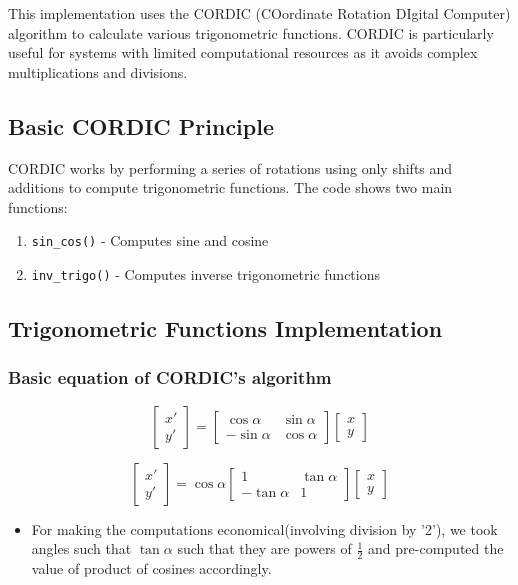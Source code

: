 \documentclass[12pt]{article}
\begin{document}
This implementation uses the CORDIC (COordinate Rotation DIgital Computer) algorithm to calculate various trigonometric functions. CORDIC is particularly useful for systems with limited computational resources as it avoids complex multiplications and divisions.

\subsection{Basic CORDIC Principle}

CORDIC works by performing a series of rotations using only shifts and additions to compute trigonometric functions. The code shows two main functions:

\begin{enumerate}
    \item \texttt{sin\_cos()} - Computes sine and cosine
    \item \texttt{inv\_trigo()} - Computes inverse trigonometric functions
\end{enumerate}

\subsection{Trigonometric Functions Implementation}
\subsubsection{Basic equation of CORDIC's algorithm}

\[
\begin{bmatrix} x' \\ y' \end{bmatrix} =
\begin{bmatrix} 
\cos \alpha & \sin \alpha \\ 
-\sin \alpha & \cos \alpha 
\end{bmatrix}
\begin{bmatrix} x \\ y \end{bmatrix}
\]

\[
\begin{bmatrix} x' \\ y' \end{bmatrix} =
\cos \alpha
\begin{bmatrix} 
1 & \tan \alpha \\ 
-\tan \alpha & 1 
\end{bmatrix}
\begin{bmatrix} x \\ y \end{bmatrix}
\]
\begin{itemize}
    \item For making the computations economical(involving division by '2'), we took angles such that $\tan{\alpha}$ such that they are powers of $\frac{1}{2}$ and pre-computed the value of product of cosines accordingly.
\end{itemize}
\end{document}
